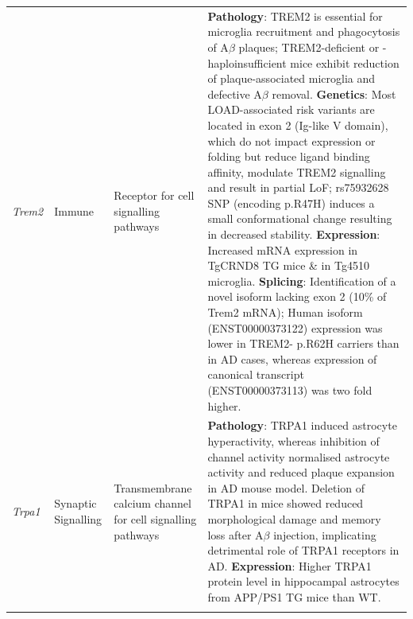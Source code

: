 \begin{landscape}
\begin{longtable}[c]{p{1cm}p{2cm}p{4cm}p{19cm}}
			\centering \textit{Trem2} &
			\centering Immune  &
			\centering Receptor for cell signalling pathways\newline &
			\tabitem \textbf{Pathology}: TREM2 is essential for microglia recruitment and phagocytosis of A$\beta$ plaques; TREM2-deficient or -haploinsufficient mice exhibit reduction of plaque-associated microglia and defective A$\beta$ removal\cite{Wang2015a}.\newline
			\tabitem \textbf{Genetics}: Most LOAD-associated risk variants are located in exon 2 (Ig-like V domain), which do not impact expression or folding but reduce ligand binding affinity\cite{Kober2016}, modulate TREM2 signalling and result in partial LoF\cite{Guerreiro2013a};  rs75932628 SNP (encoding p.R47H) induces a small conformational change resulting in decreased stability\cite{Kober2016}. \newline
			\tabitem \textbf{Expression}: Increased mRNA expression in TgCRND8 TG mice\cite{Guerreiro2013a} \& in Tg4510 microglia. \cite{Sobue2021} \newline
			\tabitem \textbf{Splicing}: Identification of a novel isoform lacking exon 2 (10\% of Trem2 mRNA)\cite{Kiianitsa2021}; Human isoform (ENST00000373122) expression was lower in TREM2- p.R62H carriers than in AD cases, whereas expression of canonical transcript (ENST00000373113) was two fold higher.\cite{Del-Aguila2019} \\
			\hdashline[0.5pt/5pt]
						
			\centering \textit{Trpa1} &
			\centering Synaptic Signalling  &
			\centering Transmembrane calcium channel for cell signalling pathways\newline &
			\tabitem \textbf{Pathology}: TRPA1 induced astrocyte hyperactivity, whereas inhibition of channel activity normalised astrocyte activity and reduced plaque expansion in AD mouse model\cite{Lee2016a}. Deletion of TRPA1 in mice showed reduced morphological damage and memory loss after A$\beta$ injection, implicating detrimental role of TRPA1 receptors in AD.\cite{Payrits2020} \newline
			\tabitem \textbf{Expression}: Higher TRPA1 protein level in hippocampal astrocytes from APP/PS1 TG mice than WT\cite{Lee2016a}. \\
			\hdashline[0.5pt/5pt]
			

\end{longtable}
\end{landscape}
